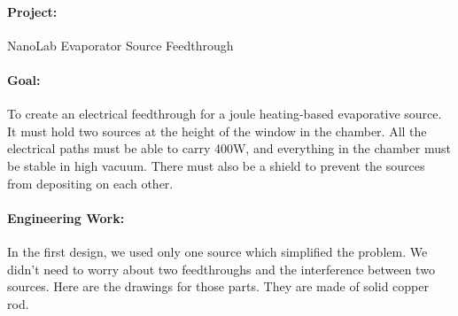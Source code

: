 \documentclass[12pt]{report}
\begin{document}
\paragraph{Project:} NanoLab Evaporator Source Feedthrough
\paragraph{Goal:} To create an electrical feedthrough for a joule heating-based evaporative source. It must hold two sources at the height of the window in the chamber. All the electrical paths must be able to carry 400W, and everything in the chamber must be stable in high vacuum. There must also be a shield to prevent the sources from depositing on each other.

\paragraph{Engineering Work:}
In the first design, we used only one source which simplified the problem. We didn't need to worry about two feedthroughs and the interference between two sources. Here are the drawings for those parts. They are made of solid copper rod.
\end{document}
